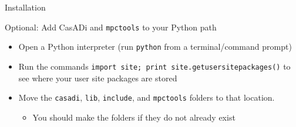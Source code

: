 \documentclass[xcolor=dvipsnames]{beamer}
\begin{document}
\begin{frame}[allowframebreaks]{Installation}
    \medskip
    
    Optional: Add CasADi and \texttt{mpctools} to your Python path
    \begin{itemize}
        \item Open a Python interpreter (run \lstinline[style=shell]!python! from a terminal/command prompt)
        \item Run the commands \lstinline[style=python]!import site; print site.getusersitepackages()! to see where your user site packages are stored
        \item Move the \texttt{casadi}, \texttt{lib}, \texttt{include}, and \texttt{mpctools} folders to that location.
        \begin{itemize}
            \item You should make the folders if they do not already exist
        \end{itemize}
    \end{itemize}
\end{frame}
\end{document}
